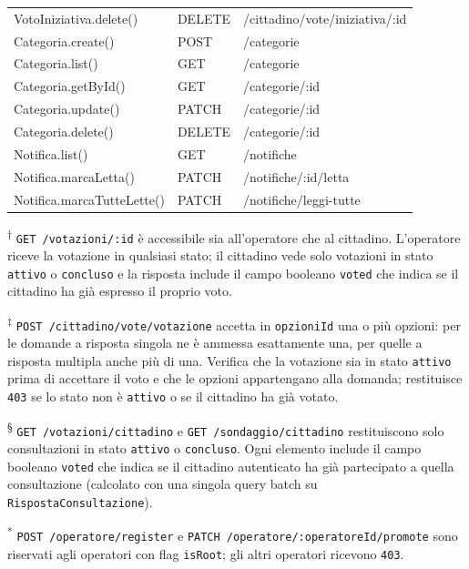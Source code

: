 \documentclass[12pt, a4paper]{article}
\begin{document}
\begin{longtable}{>{\ttfamily\small}p{} p{} >{\ttfamily\small}p{}}
  VotoIniziativa.delete() & DELETE & /cittadino/vote/iniziativa/:id \\
  \addlinespace
  Categoria.create() & POST & /categorie \\
  Categoria.list() & GET & /categorie \\
  Categoria.getById() & GET & /categorie/:id \\
  Categoria.update() & PATCH & /categorie/:id \\
  Categoria.delete() & DELETE & /categorie/:id \\
  \addlinespace
  Notifica.list() & GET & /notifiche \\
  Notifica.marcaLetta() & PATCH & /notifiche/:id/letta \\
  Notifica.marcaTutteLette() & PATCH & /notifiche/leggi-tutte \\

\end{longtable}

\vspace{1cm}

\noindent\textsuperscript{†} \texttt{GET /votazioni/:id} è accessibile sia all'operatore che al cittadino.
L'operatore riceve la votazione in qualsiasi stato; il cittadino vede solo votazioni in stato
\texttt{attivo} o \texttt{concluso} e la risposta include il campo booleano \texttt{voted} che
indica se il cittadino ha già espresso il proprio voto.

\noindent\textsuperscript{‡} \texttt{POST /cittadino/vote/votazione} accetta in \texttt{opzioniId}
una o più opzioni: per le domande a risposta singola ne è ammessa esattamente una, per quelle a
risposta multipla anche più di una. Verifica che la votazione sia in stato \texttt{attivo} prima di
accettare il voto e che le opzioni appartengano alla domanda; restituisce \texttt{403} se lo stato
non è \texttt{attivo} o se il cittadino ha già votato.

\noindent\textsuperscript{§} \texttt{GET /votazioni/cittadino} e \texttt{GET /sondaggio/cittadino}
restituiscono solo consultazioni in stato \texttt{attivo} o \texttt{concluso}. Ogni elemento include
il campo booleano \texttt{voted} che indica se il cittadino autenticato ha già partecipato a quella
consultazione (calcolato con una singola query batch su \texttt{RispostaConsultazione}).

\noindent\textsuperscript{*} \texttt{POST /operatore/register} e
\texttt{PATCH /operatore/:operatoreId/promote} sono riservati agli operatori con flag
\texttt{isRoot}; gli altri operatori ricevono \texttt{403}.
\end{document}
